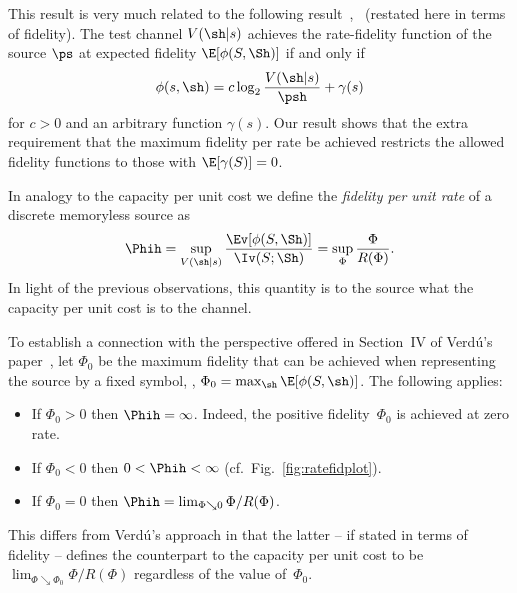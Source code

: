 \begin{remark}
  \label{rem:tcontc2}
  This result is very much related to the following result~\cite[Section~2.3,
  Problem~3]{CsiszarK1981},~\cite{GastparRV2003} (restated here in terms of
  fidelity). The test channel $V(\sh|s)$
  achieves the rate-fidelity function of the source $\ps$ at expected
  fidelity $\E[\phi(S,\Sh)]$ if and only if
  \[ \phi(s,\sh) = c \log_2 \frac{V(\sh|s)}{\psh} + \gamma(s) \]
  for $c > 0$ and an arbitrary function $\gamma(s)$. Our result shows that the
  extra requirement that the maximum fidelity per rate be achieved restricts the
  allowed fidelity functions to those with $\E[\gamma(S)] = 0$.
\end{remark}



In analogy to the capacity per unit cost we define the \emph{fidelity per unit
rate} of a discrete memoryless source as
\[ \Phih = \sup_{V(\sh|s)} \frac{\Ev[\phi(S,\Sh)]}{\Iv(S;\Sh)} =  \sup_{\Phi}
\frac{\Phi}{R(\Phi)}. \]
In light of the previous observations, this quantity is to the source what the
capacity per unit cost is to the channel. 

\begin{remark}
  To establish a connection with the perspective offered in Section~IV of
  Verd\'u's paper~\cite{Verdu1990}, let $\Phi_0$ be the maximum fidelity that can
  be achieved when representing the source by a fixed symbol, \ie, $\Phi_0 =
  \max_{\sh} \E[\phi(S, \sh)]$. The following applies:
\begin{itemize}
  \item If $\Phi_0 > 0$ then $\Phih = \infty$. Indeed, the positive
    fidelity~$\Phi_0$ is achieved at zero rate.
  \item If $\Phi_0 < 0$ then $0 < \Phih < \infty$
    (cf.~Fig.~\ref{fig:ratefidplot}). 
  \item If $\Phi_0 = 0$ then $\Phih = \lim_{\Phi \searrow 0} \Phi /
    R(\Phi)$. 
\end{itemize}
This differs from Verd\'u's approach in that the latter -- if stated in terms of
fidelity -- defines the counterpart to the capacity per unit cost to be
$\lim_{\Phi \searrow \Phi_0} \Phi / R(\Phi)$ regardless of the value
of~$\Phi_0$. 
\end{remark}


